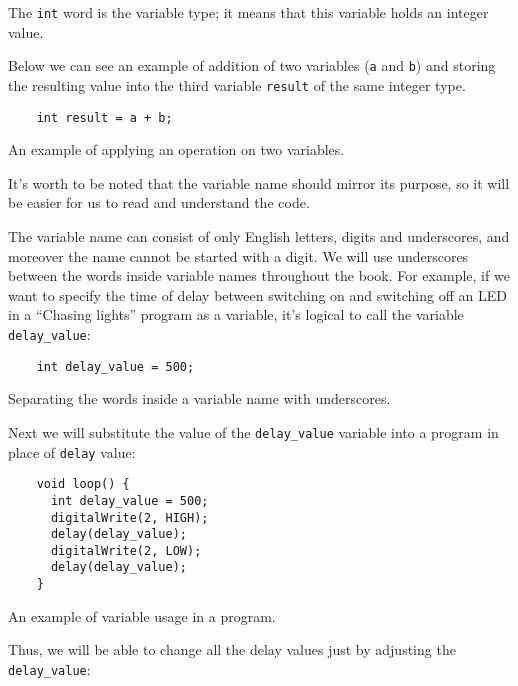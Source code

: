 \documentclass[../sparc.tex]{subfiles}
\begin{document}
The \texttt{int} word is the variable type; it means that this variable holds an
integer value.

Below we can see an example of addition of two variables (\texttt{a} and
\texttt{b}) and storing the resulting value into the third variable
\texttt{result} of the same integer type.

\begin{listing}[ht]
  \begin{verbatim}
    int result = a + b;
  \end{verbatim}
  \label{listing:dialogues-with-computer-variable-operations-example}
  \caption{An example of applying an operation on two variables.}
\end{listing}

It's worth to be noted that the variable name should mirror its purpose, so it
will be easier for us to read and understand the code.

The variable name can consist of only English letters, digits and underscores,
and moreover the name cannot be started with a digit.  We will use underscores
between the words inside variable names throughout the book.  For example, if we
want to specify the time of delay between switching on and switching off an LED
in a ``Chasing lights'' program as a variable, it's logical to call the variable
\texttt{delay\_value}:

\begin{listing}[ht]
  \begin{verbatim}
    int delay_value = 500;
  \end{verbatim}
  \label{listing:dialogues-with-computer-variable-names}
  \caption{Separating the words inside a variable name with underscores.}
\end{listing}

Next we will substitute the value of the \texttt{delay\_value} variable into a
program in place of \texttt{delay} value:

\begin{listing}[ht]
  \begin{verbatim}
    void loop() {
      int delay_value = 500;
      digitalWrite(2, HIGH);
      delay(delay_value);
      digitalWrite(2, LOW);
      delay(delay_value);
    }
  \end{verbatim}
  \label{listing:dialogues-with-computer-variable-usage}
  \caption{An example of variable usage in a program.}
\end{listing}

Thus, we will be able to change all the delay values just by adjusting the
\texttt{delay\_value}:
\end{document}
